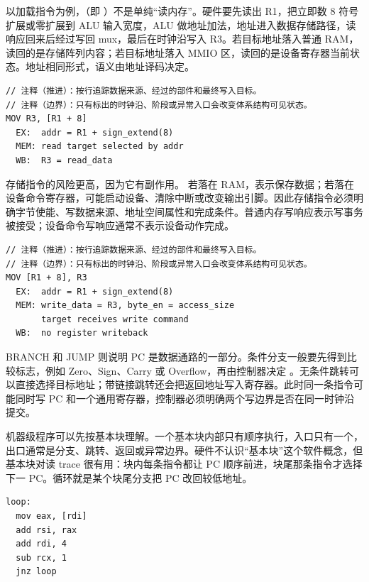以加载指令为例，（即 ）不是单纯“读内存”。硬件要先读出 R1，把立即数 8 符号扩展或零扩展到 ALU 输入宽度，ALU 做地址加法，地址进入数据存储路径，读响应回来后经过写回 mux，最后在时钟沿写入 R3。若目标地址落入普通 RAM，读回的是存储阵列内容；若目标地址落入 MMIO 区，读回的是设备寄存器当前状态。地址相同形式，语义由地址译码决定。

\begin{lstlisting}
// 注释（推进）：按行追踪数据来源、经过的部件和最终写入目标。
// 注释（边界）：只有标出的时钟沿、阶段或异常入口会改变体系结构可见状态。
MOV R3, [R1 + 8]
  EX:  addr = R1 + sign_extend(8)
  MEM: read target selected by addr
  WB:  R3 = read_data
\end{lstlisting}

存储指令的风险更高，因为它有副作用。 若落在 RAM，表示保存数据；若落在设备命令寄存器，可能启动设备、清除中断或改变输出引脚。因此存储指令必须明确字节使能、写数据来源、地址空间属性和完成条件。普通内存写响应表示写事务被接受；设备命令写响应通常不表示设备动作完成。

\begin{lstlisting}
// 注释（推进）：按行追踪数据来源、经过的部件和最终写入目标。
// 注释（边界）：只有标出的时钟沿、阶段或异常入口会改变体系结构可见状态。
MOV [R1 + 8], R3
  EX:  addr = R1 + sign_extend(8)
  MEM: write_data = R3, byte_en = access_size
       target receives write command
  WB:  no register writeback
\end{lstlisting}

BRANCH 和 JUMP 则说明 PC 是数据通路的一部分。条件分支一般要先得到比较标志，例如 Zero、Sign、Carry 或 Overflow，再由控制器决定 。无条件跳转可以直接选择目标地址；带链接跳转还会把返回地址写入寄存器。此时同一条指令可能同时写 PC 和一个通用寄存器，控制器必须明确两个写边界是否在同一时钟沿提交。

机器级程序可以先按基本块理解。一个基本块内部只有顺序执行，入口只有一个，出口通常是分支、跳转、返回或异常边界。硬件不认识“基本块”这个软件概念，但基本块对读 trace 很有用：块内每条指令都让 PC 顺序前进，块尾那条指令才选择下一 PC。循环就是某个块尾分支把 PC 改回较低地址。

\begin{lstlisting}
loop:
  mov eax, [rdi]
  add rsi, rax
  add rdi, 4
  sub rcx, 1
  jnz loop
\end{lstlisting}


